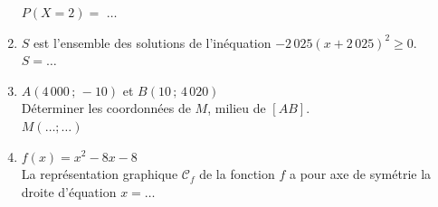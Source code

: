 \documentclass[a4paper,11pt,landscape,exos]{nsi} %
\begin{document}
\begin{multicols}{2}
\begin{enumerate}[itemsep=1em]
\medskip
 $P(X=2)=$ $\ldots$
	\item $S$ est l'ensemble des  solutions  de l'inéquation
             $-2\,025(x+2\,025)^2 \geqslant 0$.\\$S=\ldots$
	\item $A(4\,000\,;\,-10)$ et $B(10\,;\,4\,020)$\\
         Déterminer les coordonnées de $M$, milieu de $[AB]$.\\$M(\ldots;\ldots)$
	\item $f(x)=x^2-8x-8$ \\
           La représentation graphique $\mathcal{C}_f$ de la fonction $f$ a pour axe de symétrie la droite d'équation $x=$$\ldots$      
	
\end{enumerate}


\vfill\null
\end{multicols}

\newpage
\end{document}
